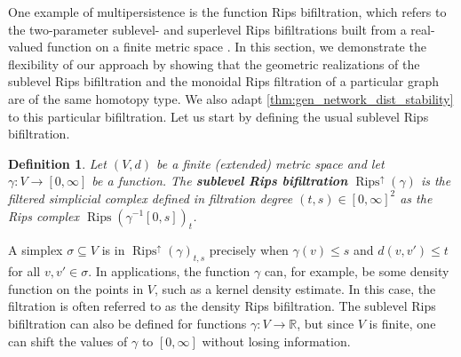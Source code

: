 \documentclass[a4paper,11pt]{article}
\newcounter{dummy}\numberwithin{dummy}{section}
\newtheorem{definition}[dummy]{Definition}
\theoremstyle{remark}
\begin{document}
One example of multipersistence is the function Rips bifiltration, which refers to the two-parameter sublevel- and superlevel Rips bifiltrations built from a real-valued function on a finite metric space \cite{botnan2022introduction,alonso2024probabilistic,lesnick2019lecture,lesnick2015theory}. In this section, we demonstrate the flexibility of our approach by showing that the geometric realizations of the sublevel Rips bifiltration and the monoidal Rips filtration of a particular graph are of the same homotopy type. We also adapt \cref{thm:gen_network_dist_stability} to this particular bifiltration. Let us start by defining the usual sublevel Rips bifiltration.

\begin{definition}
Let $(V,d)$ be a finite (extended) metric space and let $\gamma\colon V\to[0,\infty]$ be a function. The \textbf{sublevel Rips bifiltration} $\operatorname{Rips}^\uparrow(\gamma)$ is the filtered simplicial complex defined in filtration degree $(t,s)\in[0,\infty]^2$ as the Rips complex $\operatorname{Rips}\left(\gamma^{-1}[0,s]\right)_t$. 
\end{definition}
A simplex $\sigma\subseteq V$ is in $\operatorname{Rips}^\uparrow(\gamma)_{t,s}$ precisely when $\gamma(v)\leq s$ and $d(v,v')\leq t$ for all $v,v'\in\sigma$.  In applications, the function $\gamma$ can, for example, be some density function on the points in $V$, such as a kernel density estimate. In this case, the filtration is often referred to as the density Rips bifiltration. The sublevel Rips bifiltration can also be defined for functions $\gamma\colon V\to\mathbb{R}$, but since $V$ is finite, one can shift the values of $\gamma$ to $[0,\infty]$ without losing information.
\end{document}
